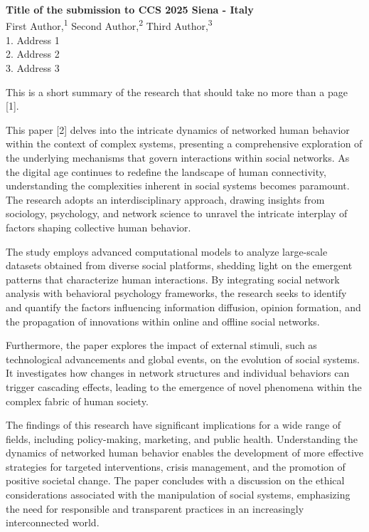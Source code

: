 \documentclass[11pt]{article}
\renewcommand{\title}[1]{{\noindent\large\bfseries#1\medskip\\}}
\renewcommand{\author}[2]{{\noindent #1 \medskip\\ \small #2 \medskip\\}}
\begin{document}
\title{Title of the submission to CCS 2025 Siena - Italy}
\author{
First Author,\textsuperscript{1}
Second Author,\textsuperscript{2}
Third Author,\textsuperscript{3}
}
{
1. Address 1\\
2. Address 2\\
3. Address 3
}

This is a short summary of the research that should take no more than a page [1].

This paper [2] delves into the intricate dynamics of networked human behavior within the context of complex systems, presenting a comprehensive exploration of the underlying mechanisms that govern interactions within social networks. As the digital age continues to redefine the landscape of human connectivity, understanding the complexities inherent in social systems becomes paramount. The research adopts an interdisciplinary approach, drawing insights from sociology, psychology, and network science to unravel the intricate interplay of factors shaping collective human behavior.

The study employs advanced computational models to analyze large-scale datasets obtained from diverse social platforms, shedding light on the emergent patterns that characterize human interactions. By integrating social network analysis with behavioral psychology frameworks, the research seeks to identify and quantify the factors influencing information diffusion, opinion formation, and the propagation of innovations within online and offline social networks.

Furthermore, the paper explores the impact of external stimuli, such as technological advancements and global events, on the evolution of social systems. It investigates how changes in network structures and individual behaviors can trigger cascading effects, leading to the emergence of novel phenomena within the complex fabric of human society.

The findings of this research have significant implications for a wide range of fields, including policy-making, marketing, and public health. Understanding the dynamics of networked human behavior enables the development of more effective strategies for targeted interventions, crisis management, and the promotion of positive societal change. The paper concludes with a discussion on the ethical considerations associated with the manipulation of social systems, emphasizing the need for responsible and transparent practices in an increasingly interconnected world.
\end{document}
